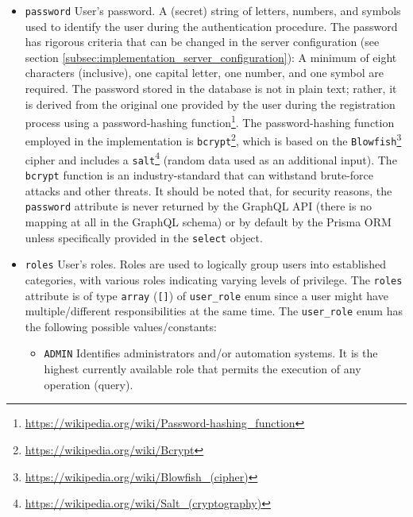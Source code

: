 \begin{itemize}
  \item \texttt{password}
    \newline
    User's password.
    \newline
    A (secret) string of letters, numbers, and symbols used to identify the user
    during the authentication procedure.
    \newline
    The password has rigorous criteria that can be changed in the server
    configuration (see section \ref{subsec:implementation_server_configuration}):
    A minimum of eight characters (inclusive), one capital letter, one number,
    and one symbol are required.
    \newline
    The password stored in the database is not in plain text; rather, it is derived
    from the original one provided by the user during the registration process using
    a password-hashing function\footnote{\url{https://wikipedia.org/wiki/Password-hashing_function}}.
    The password-hashing function employed in the implementation is \texttt{bcrypt}\footnote{\url{https://wikipedia.org/wiki/Bcrypt}},
    which is based on the \texttt{Blowfish}\footnote{\url{https://wikipedia.org/wiki/Blowfish_(cipher)}}
    cipher and includes a \texttt{salt}\footnote{\url{https://wikipedia.org/wiki/Salt_(cryptography)}}
    (random data used as an additional input). The \texttt{bcrypt} function is
    an industry-standard that can withstand brute-force attacks and other
    threats\cite{bcrypt}.
    \newline
    It should be noted that, for security reasons, the \texttt{password} attribute
    is never returned by the GraphQL API (there is no mapping at all in the
    GraphQL schema) or by default by the Prisma ORM unless specifically provided
    in the \texttt{select} object.

  \item \texttt{roles}
    \newline
    User's roles.
    \newline
    Roles are used to logically group users into established categories, with
    various roles indicating varying levels of privilege.
    \newline
    The \texttt{roles} attribute is of type \texttt{array} (\texttt{[]}) of \texttt{user\_role}
    enum since a user might have multiple/different responsibilities at the same
    time.
    \newline
    The \texttt{user\_role} enum has the following possible values/constants:
    \begin{itemize}
      \item \texttt{ADMIN}
        \newline
        Identifies administrators and/or automation systems.
        \newline
        It is the highest currently available role that permits the execution of
        any operation (query).


\end{itemize}
\end{itemize}
